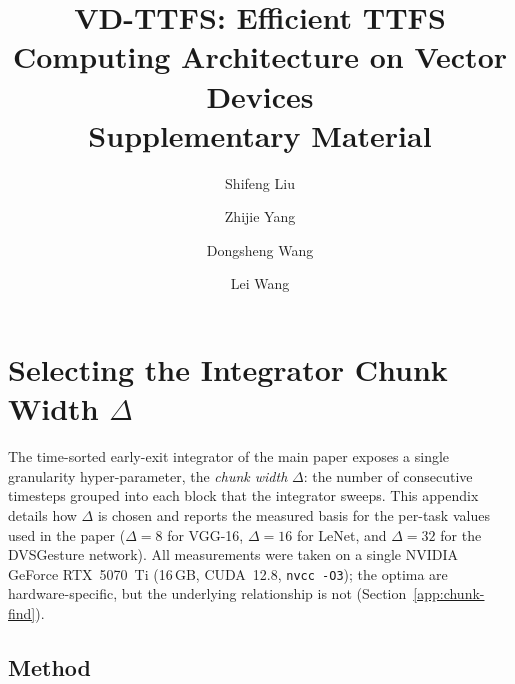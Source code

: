 \documentclass[runningheads]{llncs}
\begin{document}
\title{VD-TTFS: Efficient TTFS Computing Architecture on Vector Devices\\
       \large Supplementary Material}

\author{Shifeng Liu \and
Zhijie Yang \and
Dongsheng Wang \and
Lei Wang}



\maketitle

\appendix

\section{Selecting the Integrator Chunk Width $\Delta$}\label{app:chunk}

The time-sorted early-exit integrator of the main paper exposes a single
granularity hyper-parameter, the \emph{chunk width} $\Delta$: the number of
consecutive timesteps grouped into each block that the integrator sweeps. This
appendix details how $\Delta$ is chosen and reports the measured basis for the
per-task values used in the paper ($\Delta=8$ for VGG-16, $\Delta=16$ for LeNet,
and $\Delta=32$ for the DVSGesture network). All measurements were taken on a
single NVIDIA GeForce RTX~5070~Ti (16\,GB, CUDA~12.8, \texttt{nvcc -O3}); the
optima are hardware-specific, but the underlying relationship is not (Section~\ref{app:chunk-find}).

\subsection{Method}\label{app:chunk-method}
\end{document}
